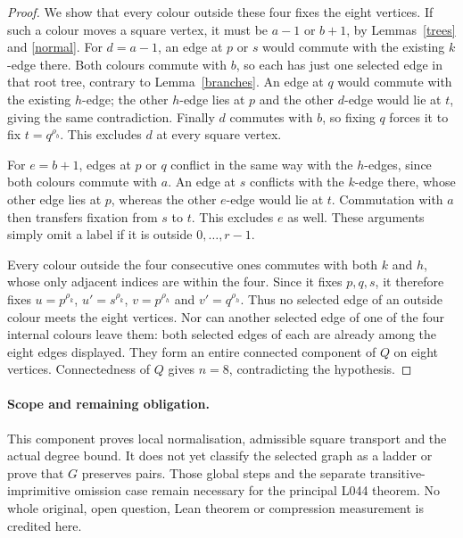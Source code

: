\documentclass[11pt,a4paper]{article}
\begin{document}
\begin{proof}
We show that every colour outside these four fixes the eight
vertices. If such a colour moves a square vertex, it must be
$a-1$ or $b+1$, by Lemmas~\ref{trees} and \ref{normal}.
For $d=a-1$, an edge at $p$ or $s$ would commute with the
existing $k$-edge there. Both colours commute with $b$, so
each has just one selected edge in that root tree, contrary
to Lemma~\ref{branches}. An edge at $q$ would commute with
the existing $h$-edge; the other $h$-edge lies at $p$ and the
other $d$-edge would lie at $t$, giving the same contradiction.
Finally $d$ commutes with $b$, so fixing $q$ forces it to fix
$t=q^{\rho_b}$. This excludes $d$ at every square vertex.

For $e=b+1$, edges at $p$ or $q$ conflict in the same way
with the $h$-edges, since both colours commute with $a$.
An edge at $s$ conflicts with the $k$-edge there, whose other
edge lies at $p$, whereas the other $e$-edge would lie at
$t$. Commutation with $a$ then transfers fixation from $s$
to $t$. This excludes $e$ as well. These arguments simply
omit a label if it is outside $0,\ldots,r-1$.

Every colour outside the four consecutive ones commutes with
both $k$ and $h$, whose only adjacent indices are within the
four. Since it fixes $p,q,s$, it therefore fixes
$u=p^{\rho_k}$, $u'=s^{\rho_k}$,
$v=p^{\rho_h}$ and $v'=q^{\rho_h}$. Thus no selected edge
of an outside colour meets the eight vertices. Nor can another
selected edge of one of the four internal colours leave them:
both selected edges of each are already among the eight edges
displayed. They form an entire connected component of $Q$ on
eight vertices. Connectedness of $Q$ gives $n=8$, contradicting
the hypothesis.
\end{proof}

\paragraph{Scope and remaining obligation.}
This component proves local normalisation, admissible square
transport and the actual degree bound. It does not yet classify
the selected graph as a ladder or prove that $G$ preserves pairs.
Those global steps and the separate transitive-imprimitive omission
case remain necessary for the principal L044 theorem. No whole
original, open question, Lean theorem or compression measurement
is credited here.
\end{document}
